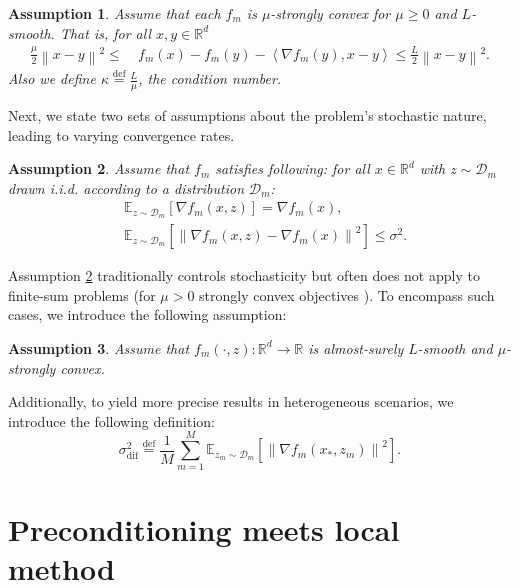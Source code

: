 \documentclass[sn-mathphys,Numbered]{sn-jnl}%
\newtheorem{assumption}{Assumption}
\newcommand*{\R}{{\mathbb R}}
\renewcommand{\|}{\parallel}
\newcommand\ec[2][]{\ensuremath{\mathbb{E}_{#1} \left[#2\right]}}
\newcommand\ecn[3][]{\ec[#1]{\norm{#2}^2_{#3}}}
\newcommand\ev[1]{\left \langle #1 \right \rangle}
\newcommand{\norm}[1]{\left\lVert#1\right\rVert}
\newcommand{\sqn}[1]{{\left\lVert#1\right\rVert}^2}
\newcommand{\D}{\mathcal{D}}
\newcommand{\eqdef}{\overset{\text{def}}{=}}
\newcommand{\sigmaf}{\sigma_{\mathrm{dif}}}
\renewcommand {\*} {\ast}
\def\R{\mathbb{R}}
\begin{document}
\begin{assumption}
    \label{asm:convexity-and-smoothness}
     Assume that each $f_m$ is $\mu$-strongly convex for $\mu \geq 0$ and $L$-smooth. That is, for all $x, y \in \R^d$
     \begin{align*}
          \frac{\mu}{2} \sqn{x - y} \leq&\ f_m (x) - f_m (y) - \ev{\nabla f_m (y), x - y}
          \leq \frac{L}{2} \sqn{x - y}.
     \end{align*}
      Also we define $\kappa \eqdef \frac{L}{\mu}$, the condition number.
\end{assumption}
Next, we state two sets of assumptions about the problem's stochastic nature, leading to varying convergence rates.
\begin{assumption}
    \label{asm:uniformly-bounded-variance}
    Assume that $f_m$ satisfies 
    following:
  for all $x \in \R^d$ with $z \sim {\D_m}$ 
  drawn i.i.d.  according to a distribution ${\D_m}$:
    \begin{eqnarray*}
        &\ec[z \sim \D_m]{\nabla f_m(x, z)} = \nabla f_m(x), \\
        &\ecn[z \sim \D_m]{\nabla f_m(x, z) - \nabla f_m(x)}{} \leq \sigma^2.
    \end{eqnarray*}
\end{assumption}
Assumption \ref{asm:uniformly-bounded-variance} traditionally controls stochasticity but often does not apply to finite-sum problems (for $\mu > 0$ strongly convex objectives \cite{nguyen2018sgd}). To encompass such cases, we introduce the following assumption:
\begin{assumption}
    \label{asm:finite-sum-stochastic-gradients}
    Assume that $f_m(\cdot, z): \R^d \to \R$ is almost-surely $L$-smooth and $\mu$-strongly convex.
\end{assumption}
Additionally, to yield more precise results in heterogeneous scenarios, we introduce the following definition:
\[ \sigmaf^2 \eqdef \frac{1}{M} \sum_{m=1}^{M} \ecn[z_m \sim \D_m]{\nabla f_m (x_\ast, z_m)}{}. \]





\section{Preconditioning meets local method}
\end{document}

